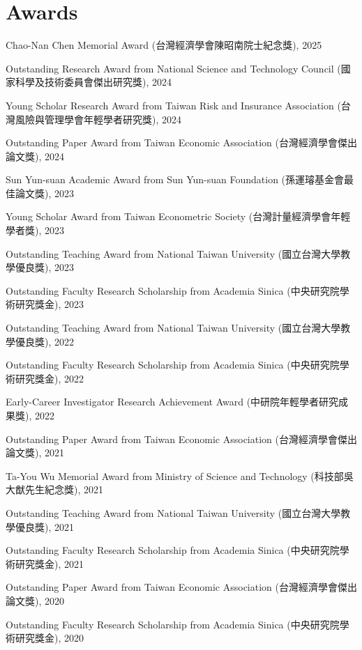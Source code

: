 \documentclass[10pt,letterpaper]{article}
\renewenvironment{itemize}{
  \begin{list}{}{
      \setlength{\leftmargin}{1.5em}
      \setlength{\itemsep}{0.25em}
      \setlength{\parskip}{0pt}
      \setlength{\parsep}{0.25em}
    }
}{
  \end{list}
}
\begin{document}
\section*{\textbf{Awards}}

\begin{itemize}
	\item Chao-Nan Chen Memorial Award (台灣經濟學會陳昭南院士紀念獎), 2025
    \item 	Outstanding Research Award from National Science and Technology Council (國家科學及技術委員會傑出研究獎), 2024
	\item Young Scholar Research Award from Taiwan Risk and Insurance Association (台灣風險與管理學會年輕學者研究獎), 2024
		\item Outstanding Paper Award from Taiwan Economic Association (台灣經濟學會傑出論文獎), 2024
	\item Sun Yun-suan Academic Award from Sun Yun-suan Foundation (孫運璿基金會最佳論文獎), 2023
	\item Young Scholar Award from Taiwan Econometric Society (台灣計量經濟學會年輕學者獎), 2023
	\item Outstanding Teaching Award from National Taiwan University (國立台灣大學教學優良獎), 2023
	\item Outstanding Faculty Research Scholarship from Academia Sinica (中央研究院學術研究獎金), 2023
	\item Outstanding Teaching Award from National Taiwan University (國立台灣大學教學優良獎), 2022
	\item Outstanding Faculty Research Scholarship from Academia Sinica (中央研究院學術研究獎金), 2022
	\item Early-Career Investigator Research Achievement Award (中研院年輕學者研究成果獎), 2022
	\item Outstanding Paper Award from Taiwan Economic Association (台灣經濟學會傑出論文獎), 2021
	\item Ta-You Wu Memorial Award from Ministry of Science and Technology (科技部吳大猷先生紀念獎), 2021
	\item Outstanding Teaching Award from National Taiwan University (國立台灣大學教學優良獎), 2021
	\item Outstanding Faculty Research Scholarship from Academia Sinica (中央研究院學術研究獎金), 2021
	\item Outstanding Paper Award from Taiwan Economic Association (台灣經濟學會傑出論文獎), 2020
	\item Outstanding Faculty Research Scholarship from Academia Sinica (中央研究院學術研究獎金), 2020
\end{itemize}
\end{document}

